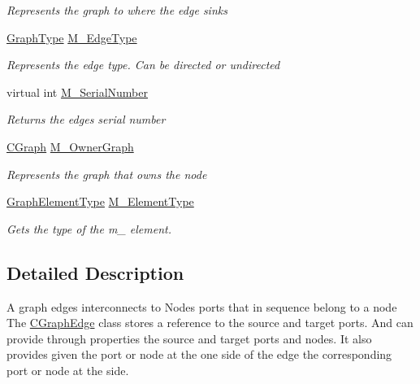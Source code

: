 \begin{DoxyCompactItemize}
\begin{DoxyCompactList}\small\item\em Represents the graph to where the edge sinks \end{DoxyCompactList}\item 
\hyperlink{namespace_graph_library_1_1_generics_a1bac729ea88e6f3925406df33f15d056}{Graph\+Type} \hyperlink{class_graph_library_1_1_c_graph_edge_aeee79cda191cc06d78688848f6168e8c}{M\+\_\+\+Edge\+Type}
\begin{DoxyCompactList}\small\item\em Represents the edge type. Can be directed or undirected \end{DoxyCompactList}\item 
virtual int \hyperlink{class_graph_library_1_1_c_graph_edge_a4a000bcf04e549dc33e522ace7facc63}{M\+\_\+\+Serial\+Number}
\begin{DoxyCompactList}\small\item\em Returns the edge\textquotesingle{}s serial number \end{DoxyCompactList}\item 
\hyperlink{class_graph_library_1_1_c_graph}{C\+Graph} \hyperlink{class_graph_library_1_1_c_graph_edge_a59088a897b7cee66d1425b65e6bb945b}{M\+\_\+\+Owner\+Graph}
\begin{DoxyCompactList}\small\item\em Represents the graph that owns the node \end{DoxyCompactList}\item 
\hyperlink{namespace_graph_library_1_1_generics_a919a165f16deccdd1b3d7e8a93423fbc}{Graph\+Element\+Type} \hyperlink{class_graph_library_1_1_c_graph_edge_a43275553517bb0104bfdfc7ea14984ea}{M\+\_\+\+Element\+Type}
\begin{DoxyCompactList}\small\item\em Gets the type of the m\+\_\+ element. \end{DoxyCompactList}\end{DoxyCompactItemize}


\subsection{Detailed Description}
A graph edges interconnects to Nodes ports that in sequence belong to a node The \hyperlink{class_graph_library_1_1_c_graph_edge}{C\+Graph\+Edge} class stores a reference to the source and target ports. And can provide through properties the source and target ports and nodes. It also provides given the port or node at the one side of the edge the corresponding port or node at the side. 



